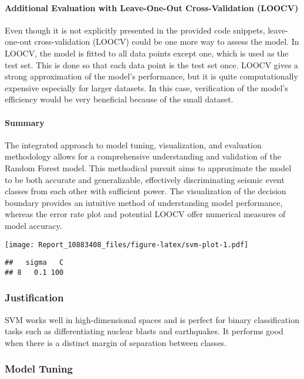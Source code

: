 \documentclass[
]{article}
\begin{document}
\paragraph{Additional Evaluation with Leave-One-Out Cross-Validation
(LOOCV)}\label{additional-evaluation-with-leave-one-out-cross-validation-loocv}

Even though it is not explicitly presented in the provided code
snippets, leave-one-out cross-validation (LOOCV) could be one more way
to assess the model. In LOOCV, the model is fitted to all data points
except one, which is used as the test set. This is done so that each
data point is the test set once. LOOCV gives a strong approximation of
the model's performance, but it is quite computationally expensive
especially for larger datasets. In this case, verification of the
model's efficiency would be very beneficial because of the small
dataset.

\paragraph{Summary}\label{summary}

The integrated approach to model tuning, visualization, and evaluation
methodology allows for a comprehensive understanding and validation of
the Random Forest model. This methodical pursuit aims to approximate the
model to be both accurate and generalizable, effectively discriminating
seismic event classes from each other with sufficient power. The
visualization of the decision boundary provides an intuitive method of
understanding model performance, whereas the error rate plot and
potential LOOCV offer numerical measures of model accuracy.

\texttt{[image: Report\_10883408\_files/figure-latex/svm-plot-1.pdf]}

\begin{verbatim}
##   sigma   C
## 8   0.1 100
\end{verbatim}

\subsubsection{Justification}\label{justification-1}

SVM works well in high-dimensional spaces and is perfect for binary
classification tasks such as differentiating nuclear blasts and
earthquakes. It performs good when there is a distinct margin of
separation between classes.

\subsubsection{Model Tuning}\label{model-tuning}
\end{document}
